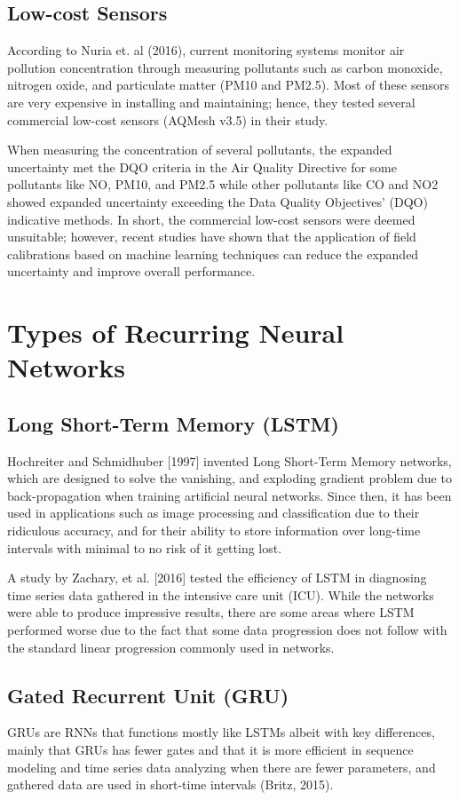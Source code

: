 \documentclass[10pt,11pt,12pt,oneside]{book}
\begin{document}
        \subsection{Low-cost Sensors}
        According to Nuria et. al (2016), current monitoring systems monitor air pollution concentration through measuring pollutants such as carbon monoxide, nitrogen oxide, and particulate matter (PM10 and PM2.5). Most of these sensors are very expensive in installing and maintaining; hence, they tested several commercial low-cost sensors (AQMesh v3.5) in their study. 
        
        When measuring the concentration of several pollutants, the expanded uncertainty met the DQO criteria in the Air Quality Directive for some pollutants like NO, PM10, and PM2.5 while other pollutants like CO and NO2 showed expanded uncertainty exceeding the Data Quality Objectives’ (DQO) indicative methods. In short, the commercial low-cost sensors were deemed unsuitable; however, recent studies have shown that the application of field calibrations based on machine learning techniques can reduce the expanded uncertainty and improve overall performance. \cite{Castell2017}
    \section{Types of Recurring Neural Networks}
        \subsection{Long Short-Term Memory (LSTM)}
        Hochreiter and Schmidhuber [1997] invented Long Short-Term Memory networks, which are designed to solve the vanishing, and exploding gradient problem due to back-propagation when training artificial neural networks. Since then, it has been used in applications such as image processing and classification due to their ridiculous accuracy, and for their ability to store information over long-time intervals with minimal to no risk of it getting lost. \cite{Hochreiter:1997:LSM:1246443.1246450} 
        
        A study by Zachary, et al. [2016] tested the efficiency of LSTM in diagnosing time series data gathered in the intensive care unit (ICU). While the networks were able to produce impressive results, there are some areas where LSTM performed worse due to the fact that some data progression does not follow with the standard linear progression commonly used in networks. \cite{DBLP:journals/corr/LiptonKEW15}
        \subsection{Gated Recurrent Unit (GRU)}
        GRUs are RNNs that functions mostly like LSTMs albeit with key differences, mainly that GRUs has fewer gates and that it is more efficient in sequence modeling and time series data analyzing when there are fewer parameters, and gathered data are used in short-time intervals (Britz, 2015). \cite{britz_2016}
        
\end{document}

